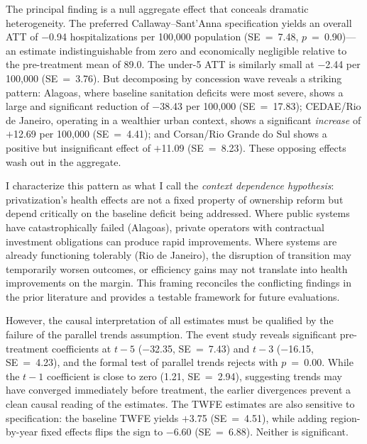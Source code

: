 \documentclass[12pt]{article}
\begin{document}
The principal finding is a null aggregate effect that conceals dramatic heterogeneity. The preferred Callaway--Sant'Anna specification yields an overall ATT of $-$0.94 hospitalizations per 100,000 population (SE~=~7.48, $p$~=~0.90)---an estimate indistinguishable from zero and economically negligible relative to the pre-treatment mean of 89.0. The under-5 ATT is similarly small at $-$2.44 per 100,000 (SE~=~3.76). But decomposing by concession wave reveals a striking pattern: Alagoas, where baseline sanitation deficits were most severe, shows a large and significant reduction of $-$38.43 per 100,000 (SE~=~17.83); CEDAE/Rio de Janeiro, operating in a wealthier urban context, shows a significant \textit{increase} of $+$12.69 per 100,000 (SE~=~4.41); and Corsan/Rio Grande do Sul shows a positive but insignificant effect of $+$11.09 (SE~=~8.23). These opposing effects wash out in the aggregate.

I characterize this pattern as what I call the \textit{context dependence hypothesis}: privatization's health effects are not a fixed property of ownership reform but depend critically on the baseline deficit being addressed. Where public systems have catastrophically failed (Alagoas), private operators with contractual investment obligations can produce rapid improvements. Where systems are already functioning tolerably (Rio de Janeiro), the disruption of transition may temporarily worsen outcomes, or efficiency gains may not translate into health improvements on the margin. This framing reconciles the conflicting findings in the prior literature and provides a testable framework for future evaluations.

However, the causal interpretation of all estimates must be qualified by the failure of the parallel trends assumption. The event study reveals significant pre-treatment coefficients at $t-5$ ($-$32.35, SE~=~7.43) and $t-3$ ($-$16.15, SE~=~4.23), and the formal test of parallel trends rejects with $p$~=~0.00. While the $t-1$ coefficient is close to zero (1.21, SE~=~2.94), suggesting trends may have converged immediately before treatment, the earlier divergences prevent a clean causal reading of the estimates. The TWFE estimates are also sensitive to specification: the baseline TWFE yields $+$3.75 (SE~=~4.51), while adding region-by-year fixed effects flips the sign to $-$6.60 (SE~=~6.88). Neither is significant.
\end{document}
